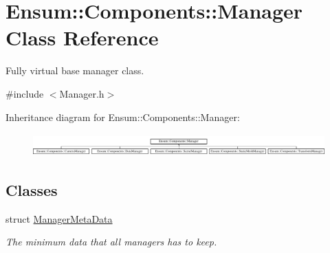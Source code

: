 \hypertarget{class_ensum_1_1_components_1_1_manager}{}\section{Ensum\+:\+:Components\+:\+:Manager Class Reference}
\label{class_ensum_1_1_components_1_1_manager}


Fully virtual base manager class.  




{\ttfamily \#include $<$Manager.\+h$>$}

Inheritance diagram for Ensum\+:\+:Components\+:\+:Manager\+:\begin{figure}[H]
\begin{center}
\leavevmode
\includegraphics[height=0.892430cm]{class_ensum_1_1_components_1_1_manager}
\end{center}
\end{figure}
\subsection*{Classes}
\begin{DoxyCompactItemize}
\item 
struct \hyperlink{struct_ensum_1_1_components_1_1_manager_1_1_manager_meta_data}{Manager\+Meta\+Data}
\begin{DoxyCompactList}\small\item\em The minimum data that all managers has to keep. \end{DoxyCompactList}\end{DoxyCompactItemize}
